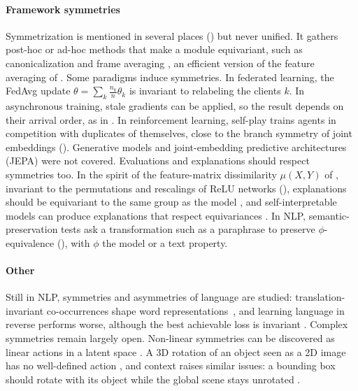 \documentclass[mathematics,review,submit,moreauthors]{Definitions/mdpi}
\begin{document}
\paragraph{Framework symmetries}
Symmetrization is mentioned in several places () but never unified.
It gathers post-hoc or ad-hoc methods that make a module equivariant, such as canonicalization \citep{kaba2023p4icml,urbano2026,ciuclea2025,kalogeropoulos2024} and frame averaging \citep{puny2021}, an efficient version of the feature averaging of .
Some paradigms induce symmetries.
In federated learning, the FedAvg update $\theta=\sum_k \frac{n_k}{n}\theta_k$ \citep{mcmahan2017p2icais} is invariant to relabeling the clients $k$.
In asynchronous training, stale gradients can be applied, so the result depends on their arrival order, as in .
In reinforcement learning, self-play \citep{silver2017,zhang2025a} trains agents in competition with duplicates of themselves, close to the branch symmetry of joint embeddings ().
Generative models and joint-embedding predictive architectures (JEPA) were not covered.
Evaluations and explanations should respect symmetries too.
In the spirit of the feature-matrix dissimilarity $\mu(X,Y)$ of \citet{godfrey2022}, invariant to the permutations and rescalings of ReLU networks (), explanations should be equivariant to the same group as the model \citep{crabbe2023}, and self-interpretable models can produce explanations that respect equivariances \citep{wang2021anips}.
In NLP, semantic-preservation tests \citep{ribeiro2020p5amacl,zarza2026,bianchi2022pnpfwebn} ask a transformation such as a paraphrase to preserve $\phi$-equivalence (), with $\phi$ the model or a text property.

\paragraph{Other}
Still in NLP, symmetries and asymmetries of language are studied: translation-invariant co-occurrences shape word representations~\citep{karkada2026}, and learning language in reverse performs worse, although the best achievable loss is invariant \citep{papadopoulos2024}.
Complex symmetries remain largely open.
Non-linear symmetries can be discovered as linear actions in a latent space \citep{yang2024p4icml}.
A 3D rotation of an object seen as a 2D image has no well-defined action \citep{park2022p3icml,wang2022b}, and context raises similar issues: a bounding box should rotate with its object while the global scene stays unrotated \citep{yu2022}.
\end{document}
